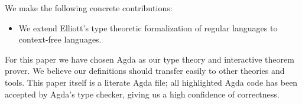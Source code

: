 
We make the following concrete contributions:
\begin{itemize}
\item We extend Elliott's type theoretic formalization of regular languages to context-free languages.
\end{itemize}

For this paper we have chosen Agda as our type theory and interactive theorem prover. We believe our definitions should transfer easily to other theories and tools. This paper itself is a literate Agda file; all highlighted Agda code has been accepted by Agda's type checker, giving us a high confidence of correctness.






